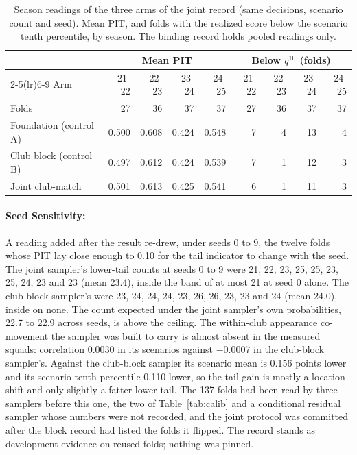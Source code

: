 \documentclass[11pt,a4paper]{article}
\begin{document}
\begin{table}[!htb]
\centering\small
\caption{Season readings of the three arms of the joint record (same decisions, scenario count and seed). Mean PIT, and folds with the realized score below the scenario tenth percentile, by season. The binding record holds pooled readings only.}
\label{tab:calibseason}
\begin{tabular}{l rrrr rrrr}
\toprule
& \multicolumn{4}{c}{Mean PIT} & \multicolumn{4}{c}{Below $q^{10}$ (folds)} \\
\cmidrule(lr){2-5}\cmidrule(lr){6-9}
Arm & 21-22 & 22-23 & 23-24 & 24-25 & 21-22 & 22-23 & 23-24 & 24-25 \\
\midrule
Folds & 27 & 36 & 37 & 37 & 27 & 36 & 37 & 37 \\
Foundation (control A) & 0.500 & 0.608 & 0.424 & 0.548 & 7 & 4 & 13 & 4 \\
Club block (control B) & 0.497 & 0.612 & 0.424 & 0.539 & 7 & 1 & 12 & 3 \\
Joint club-match & 0.501 & 0.613 & 0.425 & 0.541 & 6 & 1 & 11 & 3 \\
\bottomrule
\end{tabular}
\end{table}

\paragraph{Seed Sensitivity:} A reading added after the result re-drew, under seeds 0 to 9, the twelve folds whose PIT lay close enough to 0.10 for the tail indicator to change with the seed. The joint sampler's lower-tail counts at seeds 0 to 9 were 21, 22, 23, 25, 25, 23, 25, 24, 23 and 23 (mean 23.4), inside the band of at most 21 at seed 0 alone. The club-block sampler's were 23, 24, 24, 24, 23, 26, 26, 23, 23 and 24 (mean 24.0), inside on none. The count expected under the joint sampler's own probabilities, 22.7 to 22.9 across seeds, is above the ceiling. The within-club appearance co-movement the sampler was built to carry is almost absent in the measured squads: correlation 0.0030 in its scenarios against $-0.0007$ in the club-block sampler's. Against the club-block sampler its scenario mean is 0.156 points lower and its scenario tenth percentile 0.110 lower, so the tail gain is mostly a location shift and only slightly a fatter lower tail. The 137 folds had been read by three samplers before this one, the two of Table~\ref{tab:calib} and a conditional residual sampler whose numbers were not recorded, and the joint protocol was committed after the block record had listed the folds it flipped. The record stands as development evidence on reused folds; nothing was pinned.
\end{document}

